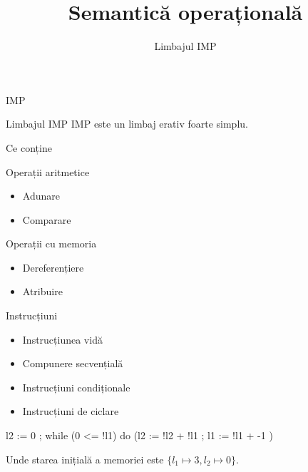 \documentclass[xcolor=pdftex,romanian,colorlinks]{beamer}
\title[SLP---IMP]{Semantică operațională}
\subtitle{Limbajul IMP}
\begin{document}
\begin{frame}
  \titlepage
\end{frame}

\begin{section}{IMP}
\begin{frame}[fragile]{Limbajul IMP}
IMP este un limbaj erativ foarte simplu.
\begin{block}{Ce conține}
\begin{minipage}{.49\columnwidth}
\begin{itemize}
\vitem Operații aritmetice
\begin{itemize}
  \item Adunare%
  \item Comparare%
\end{itemize}
\vitem Operații cu memoria
\begin{itemize}
  \item Dereferențiere%
  \item Atribuire%
\end{itemize}
\vitem Instrucțiuni
\begin{itemize}
  \item Instrucțiunea vidă
  \item Compunere secvențială%
  \item Instrucțiuni condiționale%
  \item Instrucțiuni de ciclare  %
\end{itemize}
\end{itemize}
\end{minipage}
\begin{minipage}{.49\columnwidth}
\begin{asciic}
 l2 := 0 ;
 while (0 <= !l1)  do 
   (l2 := !l2 + !l1 ;
    l1 := !l1 + -1
   )
\end{asciic}
Unde starea inițială a memoriei este $\{l_1\mapsto 3, l_2\mapsto 0\}$.
\end{minipage}
\end{block}
\end{frame}


\end{section}
\end{document}
